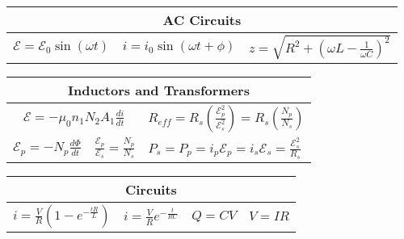 \documentclass{article}
\begin{document}
\begin{tabular}{|l | l | l|}
\hline

\multicolumn{3}{|c|}{\textbf{AC Circuits}} \\ \hline

$ \displaystyle \mathcal{E} = \mathcal{E}_0 \sin (\omega t)$ & $ \displaystyle i = i_0 \sin (\omega t + \phi)$ & $ \displaystyle z = \sqrt{R^2 + \left ( \omega L - \frac{1}{\omega C} \right )^2 }$ \\ \hline

\end{tabular}

\begin{tabular}{| l | l | l|}
\hline

\multicolumn{3}{|c|}{\textbf{Inductors and Transformers}} \\ \hline

\multicolumn{2}{|c|}{$ \displaystyle \mathcal{E} = -\mu_0 n_1 N_2 A_1 \frac{di}{dt}$} & $ \displaystyle R_{eff} = R_s \left ( \frac{\mathcal{E}_p^2}{\mathcal{E}_s^2} \right ) = R_s \left( \frac{N_p}{N_s} \right )$ \\ \hline
$ \displaystyle \mathcal{E}_p = - N_p \frac{d \Phi}{dt}$ & $ \displaystyle \frac{\mathcal{E}_p}{\mathcal{E}_s} = \frac{N_p}{N_s}$ & $ \displaystyle P_s = P_p = i_p \mathcal{E}_p = i_s \mathcal{E}_s = \frac{\mathcal{E}_s^2}{R_s}$ \\ \hline
\end{tabular}

\begin{tabular}{|l | l | l | l|}
\hline

\multicolumn{4}{|c|}{\textbf{Circuits}} \\ \hline

$ \displaystyle i = \frac{V}{R} \left (1 - e^{-\frac{t R}{L}} \right )$ & $ \displaystyle i = \frac{V}{R} e^{-\frac{t}{RC}}$ & $ \displaystyle Q=CV$ & $\displaystyle V=IR$ \\ \hline
\end{tabular}
\end{document}
